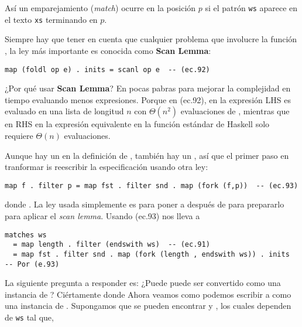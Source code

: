 Así un emparejamiento (\textit{match}) ocurre en la posición $p$ si el patrón \texttt{ws} aparece en el texto \texttt{xs} terminando en $p$.


Siempre hay que tener en cuenta que cualquier problema que involucre la función , la ley más importante es conocida como \textbf{Scan Lemma}: %
\begin{verbatim}
map (foldl op e) . inits = scanl op e  -- (ec.92)
\end{verbatim}

¿Por qué usar \textbf{Scan Lemma}? En pocas pabras para mejorar la complejidad en tiempo evaluando menos expresiones.
Porque en (ec.92), en la expresión LHS es evaluado en una lista de longitud $n$ con $\Theta(n^2)$ evaluaciones de , mientras que
en RHS en la expresión equivalente en la función estándar de Haskell  solo requiere $\Theta(n)$ evaluaciones.

Aunque hay un  en la definición de , también hay un , así que el primer paso en tranformar  is reescribir la especificación usando otra ley: %

\begin{verbatim}
map f . filter p = map fst . filter snd . map (fork (f,p))  -- (ec.93)
\end{verbatim}

donde . La ley usada simplemente es para poner a 
después de  para prepararlo para aplicar el \textit{scan lemma}. Usando (ec.93) nos lleva a

\begin{verbatim}
matches ws
  = map length . filter (endswith ws)  -- (ec.91)
  = map fst . filter snd . map (fork (length , endswith ws)) . inits  -- Por (e.93)
\end{verbatim}

La siguiente pregunta a responder es: ¿Puede  puede ser convertido
como una instancia de ? Ciértamente  donde
Ahora veamos como podemos escribir a  como una instancia de .
Supongamos que se pueden encontrar  y , los cuales dependen de \texttt{ws} tal que,

